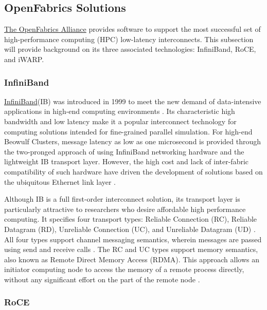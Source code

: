 \documentclass[11pt]{book}
\begin{document}
\subsection{\textbf{OpenFabrics Solutions}}

\href{www.openfabrics.org}{The OpenFabrics Alliance} provides software to
support the most successful set of high-performance computing (HPC) low-latency
interconnects. This subsection will provide background on its three associated
technologies: InfiniBand, RoCE, and iWARP.

\subsubsection{\textbf{InfiniBand}}

\href {www.infinibandta.org}{InfiniBand}\texttrademark (IB) was introduced in
1999 to meet the new demand of data-intensive applications in high-end computing
environments \cite{InfiniBandTABase-07}. Its characteristic high bandwidth and
low latency make it a popular interconnect technology for computing solutions
intended for fine-grained parallel simulation. For high-end Beowulf Clusters,
message latency as low as one microsecond is provided through the two-pronged
approach of using InfiniBand networking hardware and the lightweight IB
transport layer. However, the high cost and lack of inter-fabric compatibility
of such hardware have driven the development of solutions based on the
ubiquitous Ethernet link layer \cite{roce-announce}.

Although IB is a full first-order interconnect solution, its transport layer is
particularly attractive to researchers who desire affordable high performance
computing. It specifies four transport types: Reliable Connection (RC), Reliable
Datagram (RD), Unreliable Connection (UC), and Unreliable Datagram (UD)
\cite{InfiniBandTABase-07}. All four types support channel messaging semantics,
wherein messages are passed using send and receive calls
\cite{InfiniBandTABase-07}. The RC and UC types support memory semantics, also
known as Remote Direct Memory Access (RDMA). This approach allows an initiator
computing node to access the memory of a remote process directly, without any
significant effort on the part of the remote node \cite{sur-11}.

\subsubsection{\textbf{RoCE}}
\end{document}
